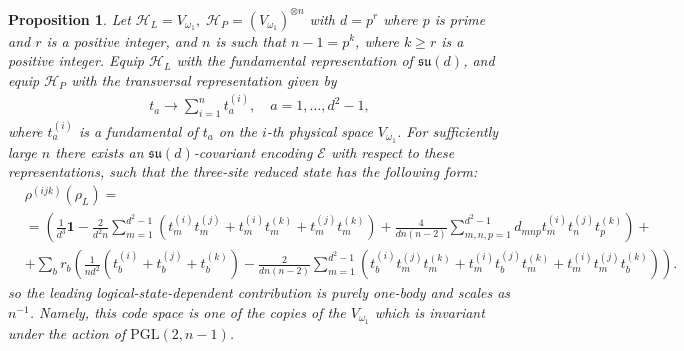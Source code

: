 \documentclass[10pt,twocolumn,superscriptaddress,aps,amsmath,amssymb,citeautoscript,floatfix,prx]{revtex4-2}
\theoremstyle{plain}
\theoremstyle{plain}
\theoremstyle{plain}
\theoremstyle{plain}
\theoremstyle{plain}
\theoremstyle{plain}
\theoremstyle{plain}
\newtheorem{smproposition}[smtheorem]{Proposition}
\theoremstyle{definition}
\theoremstyle{plain}
\begin{document}
\begin{appendix}
\begin{smproposition}\label{prop:3site-fundamental}
Let
    $
            \mathcal H_L=V_{\omega_1},\;
                    \mathcal H_P=(V_{\omega_1})^{\otimes n}
                        $
                            with $d=p^r$ where $p$ is prime and $r$ is a positive integer, 
                                and $n$ is such that $n-1=p^k$, where $k \geq r$ is a positive integer. 
                                    Equip \(\mathcal H_L\) with the fundamental representation of
                                        \(\mathfrak{su}(d)\), and equip \(\mathcal H_P\) with the transversal
                                            representation given by
                                                \begin{equation}
                                                    \begin{gathered}
                                                        t_a \rightarrow \sum_{i=1}^n t_a^{(i)}, \quad a=1,\ldots,d^2-1,
                                                            \end{gathered}
                                                                \end{equation} 
                                                                    where $t_a^{(i)}$ is a fundamental of $t_a$ on the $i$-th physical space $V_{\omega_1}$.
    For sufficiently
    large $n$ there exists an $\mathfrak{su}(d)$-covariant encoding $\mathcal{E}$ with respect to these representations, such that the three-site reduced state has the following form:
\begin{equation}\label{eq:main-3site-difference}
\begin{aligned}
    &\rho^{(ijk)}(\rho_L)=
    \\&=\left(\frac{1}{d^3} \mathbf{1}-\frac{2}{d^2 n} \sum_{m=1}^{d^2-1}\left(t_m^{(i)} t_m^{(j)}+t_m^{(i)} t_m^{(k)}+t_m^{(j)} t_m^{(k)}\right)+\frac{4}{d n(n-2)} \sum_{m, n, p=1}^{d^2-1} d_{m n p} t_m^{(i)} t_n^{(j)} t_p^{(k)}\right) +
    \\&+\sum_b r_b\left(\frac{1}{n d^2}\left(t_b^{(i)}+t_b^{(j)}+t_b^{(k)}\right)-\frac{2}{d n(n-2)} \sum_{m=1}^{d^2-1}\left(t_b^{(i)} t_m^{(j)} t_m^{(k)}+t_m^{(i)} t_b^{(j)} t_m^{(k)}+t_m^{(i)} t_m^{(j)} t_b^{(k)}\right)\right).
\end{aligned}
\end{equation}
so the leading logical-state-dependent contribution is purely one-body and scales as \(n^{-1}\). Namely, this code space is one of the copies of the $V_{\omega_1}$ which is invariant under the action of $\mathrm{PGL}(2, n-1)$.
\end{smproposition}


\end{appendix}
\end{document}
